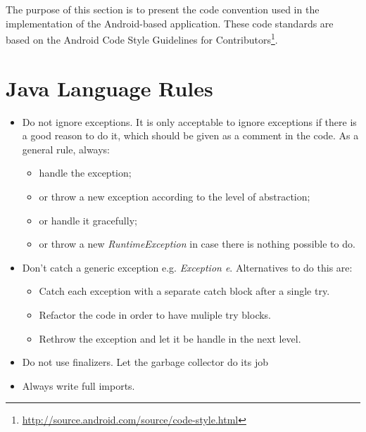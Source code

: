 \lstset{language=Java}

The purpose of this section is to present the code convention used in the implementation of the Android-based application. These code standards are based
on the Android Code Style Guidelines for Contributors\footnote{\url{http://source.android.com/source/code-style.html}}.

\section{Java Language Rules}

\begin{itemize}
  \item Do not ignore exceptions. It is only acceptable to ignore exceptions if there is a good reason to do it, which should be given as a comment in the code. As a general rule, always:
  \begin{itemize}
   \item handle the exception;
   \item or throw a new exception according to the level of abstraction;
   \item or handle it gracefully;
   \item or throw a new \textit{RuntimeException} in case there is nothing possible to do.
  \end{itemize}
  \item Don't catch a generic exception e.g. \textit{Exception e}. Alternatives to do this are:
 \begin{itemize}
    \item Catch each exception with a separate catch block after a single try.
    \item Refactor the code in order to have muliple try blocks.
    \item Rethrow the exception and let it be handle in the next level.
  \end{itemize}
  \item Do not use finalizers. Let the garbage collector do its job
  \item Always write full imports.
  

\end{itemize}

